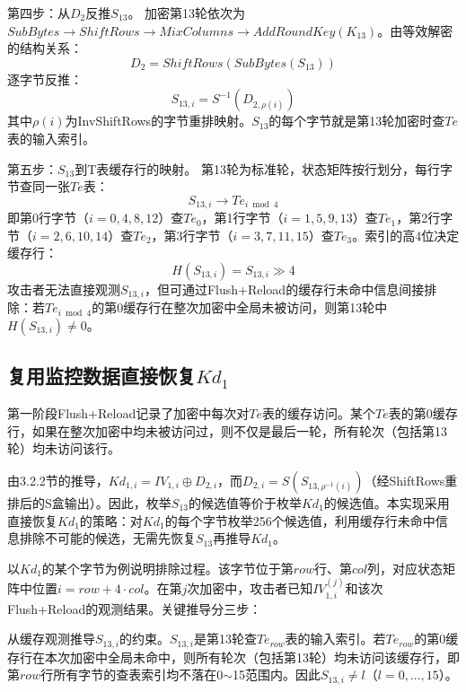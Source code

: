 第四步：从$D_2$反推$S_{13}$。
加密第13轮依次为$SubBytes \rightarrow ShiftRows \rightarrow MixColumns \rightarrow AddRoundKey(K_{13})$。由等效解密的结构关系：
\begin{equation}
D_2 = ShiftRows(SubBytes(S_{13}))
\end{equation}
逐字节反推：
\begin{equation}
S_{13,i} = S^{-1}(D_{2, \rho(i)})
\end{equation}
其中$\rho(i)$为InvShiftRows的字节重排映射。$S_{13}$的每个字节就是第13轮加密时查$Te$表的输入索引。

第五步：$S_{13}$到T表缓存行的映射。
第13轮为标准轮，状态矩阵按行划分，每行字节查同一张$Te$表：
\begin{equation}
S_{13,i} \rightarrow Te_{i \bmod 4}
\end{equation}
即第0行字节（$i = 0, 4, 8, 12$）查$Te_0$，第1行字节（$i = 1, 5, 9, 13$）查$Te_1$，第2行字节（$i = 2, 6, 10, 14$）查$Te_2$，第3行字节（$i = 3, 7, 11, 15$）查$Te_3$。索引的高4位决定缓存行：
\begin{equation}
H(S_{13,i}) = S_{13,i} \gg 4
\end{equation}
攻击者无法直接观测$S_{13,i}$，但可通过Flush+Reload的缓存行未命中信息间接排除：若$Te_{i \bmod 4}$的第0缓存行在整次加密中全局未被访问，则第13轮中$H(S_{13,i}) \neq 0$。

\subsection{复用监控数据直接恢复$Kd_1$}

第一阶段Flush+Reload记录了加密中每次对$Te$表的缓存访问。某个$Te$表的第0缓存行，如果在整次加密中均未被访问过，则不仅是最后一轮，所有轮次（包括第13轮）均未访问该行。

由3.2.2节的推导，$Kd_{1,i} = IV_{1,i} \oplus D_{2,i}$，而$D_{2,i} = S(S_{13,\rho^{-1}(i)})$（经ShiftRows重排后的S盒输出）。因此，枚举$S_{13}$的候选值等价于枚举$Kd_1$的候选值。本实现采用直接恢复$Kd_1$的策略：对$Kd_1$的每个字节枚举256个候选值，利用缓存行未命中信息排除不可能的候选，无需先恢复$S_{13}$再推导$Kd_1$。

以$Kd_1$的某个字节为例说明排除过程。该字节位于第$row$行、第$col$列，对应状态矩阵中位置$i = row + 4 \cdot col$。在第$j$次加密中，攻击者已知$IV_{1,i}^{(j)}$和该次Flush+Reload的观测结果。关键推导分三步：

从缓存观测推导$S_{13,i}$的约束。$S_{13,i}$是第13轮查$Te_{row}$表的输入索引。若$Te_{row}$的第0缓存行在本次加密中全局未命中，则所有轮次（包括第13轮）均未访问该缓存行，即第$row$行所有字节的查表索引均不落在0$\sim$15范围内。因此$S_{13,i} \neq l$（$l = 0, \dots, 15$）。

